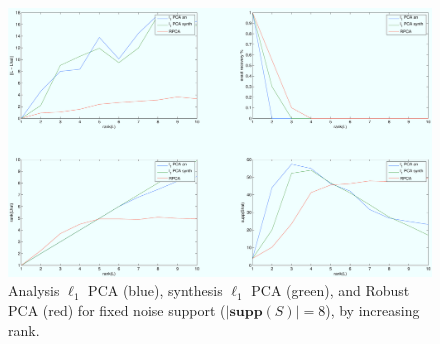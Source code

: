 \begin{figure}[h!]
\centering
\includegraphics[width=\textwidth]{../figures/l1pca_10x10_support8_by_rank.pdf}
\caption{Analysis $\ell_1$ PCA (blue), synthesis $\ell_1$ PCA (green), and Robust PCA (red) for fixed noise support ($|\mathbf{supp}(S)| = 8$), by increasing rank.}
\label{fig:l1pca_by_rank}
\end{figure}

